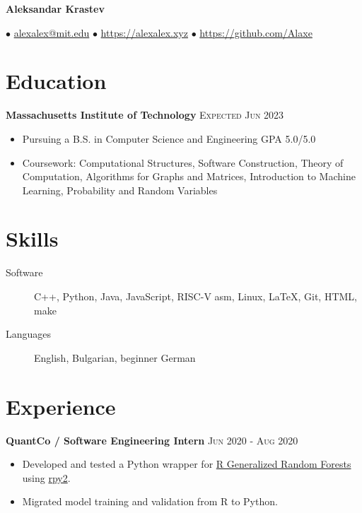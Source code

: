 \documentclass[letterpaper,11pt]{article}
\author{Aleksandar Krastev}
\date{2020-12-21}
\begin{document}
\setlength{\belowdisplayskip}{\parskip}
\setlength{\belowdisplayshortskip}{\belowdisplayskip}
\setlength{\abovedisplayskip}{\parskip}
\setlength{\abovedisplayshortskip}{\abovedisplayskip}



\centerline{{\Huge \bf Aleksandar Krastev}}
$\bullet$ \href{mailto:alexalex@mit.edu}{alexalex@mit.edu} \hfill
$\bullet$ \href{https://alexalex.xyz}{https://alexalex.xyz} \hfill
$\bullet$ \href{https://github.com/Alaxe}{https://github.com/Alaxe} \hfill

\section*{Education}
\textbf{Massachusetts Institute of Technology}
\hfill
\textsc{Expected Jun 2023}

\begin{itemize}
    \item Pursuing a B.S. in Computer Science and Engineering
        \hfill GPA 5.0/5.0
    \item Coursework:
        Computational Structures,
        Software Construction,
        Theory of Computation,
        Algorithms for Graphs and Matrices,
        Introduction to Machine Learning,
        Probability and Random Variables
\end{itemize}

\section*{Skills}
\begin{description}
    \item[Software] C++, Python, Java, JavaScript, RISC-V asm, Linux, LaTeX, Git,
        HTML, make
    \item[Languages] English, Bulgarian, beginner German
\end{description}

\section*{Experience}
\textbf{QuantCo / Software Engineering Intern}
\hfill
\textsc{Jun 2020 - Aug 2020}
\begin{itemize}
    \item Developed and tested a Python wrapper for
        \href{https://grf-labs.github.io/}{R Generalized Random Forests} using
        \href{https://rpy2.github.io/}{rpy2}.
    \item Migrated model training and validation from R to Python.
\end{itemize}
\end{document}
